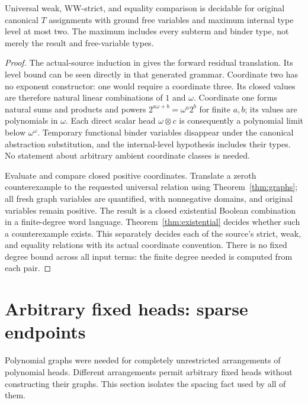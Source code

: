 \documentclass[11pt]{article}
\begin{document}
\begin{theorem}\label{thm:leveltwo}
Universal weak, WW-strict, and equality comparison is decidable for original
canonical $T$ assignments with ground free variables and maximum internal
type level at most two. The maximum includes every subterm and binder type,
not merely the result and free-variable types.
\end{theorem}
\begin{proof}
The actual-source induction in \cite{wwfoundations} gives the forward
residual translation. Its level bound can be seen directly in that generated
grammar. Coordinate two has no exponent constructor: one would require a
coordinate three. Its closed values are therefore natural linear
combinations of $1$ and $\omega$. Coordinate one forms natural sums and
products and powers
$2^{a\omega+b}=\omega^a2^b$ for finite $a,b$; its values are polynomials
in $\omega$. Each direct scalar head $\omega\otimes c$ is consequently
a polynomial limit below $\omega^\omega$. Temporary functional binder
variables disappear under the canonical abstraction substitution, and the
internal-level hypothesis includes their types. No statement about arbitrary
ambient coordinate classes is needed.

Evaluate and compare closed positive coordinates. Translate a zeroth
counterexample to the requested universal relation using
Theorem~\ref{thm:graphs}; all fresh graph variables are quantified, with
nonnegative domains, and original variables remain positive. The result
is a closed existential Boolean combination in a finite-degree word
language. Theorem~\ref{thm:existential} decides whether such a counterexample
exists. This separately decides each of the source's strict, weak, and
equality relations with its actual coordinate convention. There is no
fixed degree bound across all input terms: the finite degree needed is
computed from each pair.
\end{proof}

\section{Arbitrary fixed heads: sparse endpoints}
Polynomial graphs were needed for completely unrestricted arrangements of
polynomial heads. Different arrangements permit arbitrary fixed heads
without constructing their graphs. This section isolates the spacing fact
used by all of them.
\end{document}
